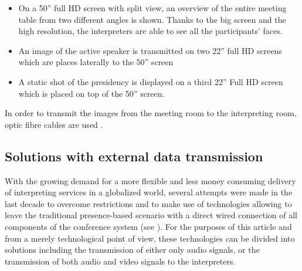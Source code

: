 \documentclass[output=paper]{langsci/langscibook}
\begin{document}
\begin{itemize}
\item On a 50” full \textsc{HD} screen with split view, an overview of the entire meeting table from two different angles is shown. Thanks to the big screen and the high resolution, the interpreters are able to see all the participants’ faces.
\item An image of the active speaker is transmitted on two 22” full \textsc{HD} screens which are places laterally to the 50” screen
\item A static shot of the presidency is displayed on a third 22” Full \textsc{HD} screen which is placed on top of the 50” screen.
\end{itemize}

In order to transmit the images from the meeting room to the interpreting room, optic fibre cables are used \citep{Technical2016}. 

\subsection{Solutions with external data transmission} 
\label{sub:ziegler:4.2}
With the growing demand for a more flexible and less money consuming delivery of interpreting services in a globalized world, several attempts were made in the last decade to overcome restrictions and to make use of technologies allowing to leave the traditional presence-based scenario with a direct wired connection of all components of the conference system (see ). For the purposes of this article and from a merely technological point of view, these technologies can be divided into solutions including the transmission of either only audio signals, or the transmission of both audio and video signals to the interpreters. 
\end{document}

